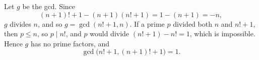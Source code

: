 Let $g$ be the gcd. Since
\[
(n+1)!+1-(n+1)\left(n!+1\right)=1-(n+1)=-n,
\]
$g$ divides $n$, and so $g=\gcd(n!+1,n)$. If a prime $p$ divided both $n$ and $n!+1$, then $p\le n$, so $p\mid n!$, and $p$ would divide $(n!+1)-n!=1$, which is impossible. Hence $g$ has no prime factors, and
\[
\gcd\bigl(n!+1,(n+1)!+1\bigr)=\boxed{1}.
\]
